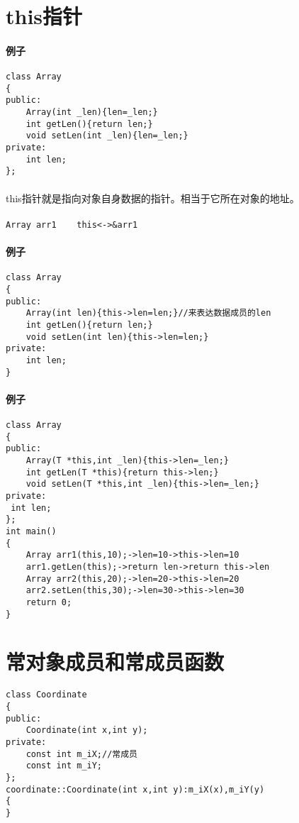 \documentclass{article}
\begin{document}
\begin{CJK}{UTF8}{gbsn}
\section{this指针}
\paragraph{例子}
\begin{verbatim}
class Array
{
public:
	Array(int _len){len=_len;}
	int getLen(){return len;}
	void setLen(int _len){len=_len;}
private:
	int len;
};
\end{verbatim}
\paragraph{}
this指针就是指向对象自身数据的指针。相当于它所在对象的地址。
\paragraph{}
\begin{verbatim}
Array arr1    this<->&arr1 
\end{verbatim}
\paragraph{例子}
\begin{verbatim}
class Array
{
public:
	Array(int len){this->len=len;}//来表达数据成员的len
	int getLen(){return len;}
	void setLen(int len){this->len=len;}
private:
	int len;
}
\end{verbatim}
\paragraph{例子}
\begin{verbatim}
class Array
{
public:
	Array(T *this,int _len){this->len=_len;}
	int getLen(T *this){return this->len;}
	void setLen(T *this,int _len){this->len=_len;}
private:
 int len;
};
int main()
{
	Array arr1(this,10);->len=10->this->len=10
	arr1.getLen(this);->return len->return this->len
	Array arr2(this,20);->len=20->this->len=20
	arr2.setLen(this,30);->len=30->this->len=30
	return 0;
}
\end{verbatim}
\section{常对象成员和常成员函数}
\begin{verbatim}
class Coordinate
{
public:
	Coordinate(int x,int y);
private:
	const int m_iX;//常成员
	const int m_iY;
};
coordinate::Coordinate(int x,int y):m_iX(x),m_iY(y)
{
}
\end{verbatim}

\end{CJK}
\end{document}
